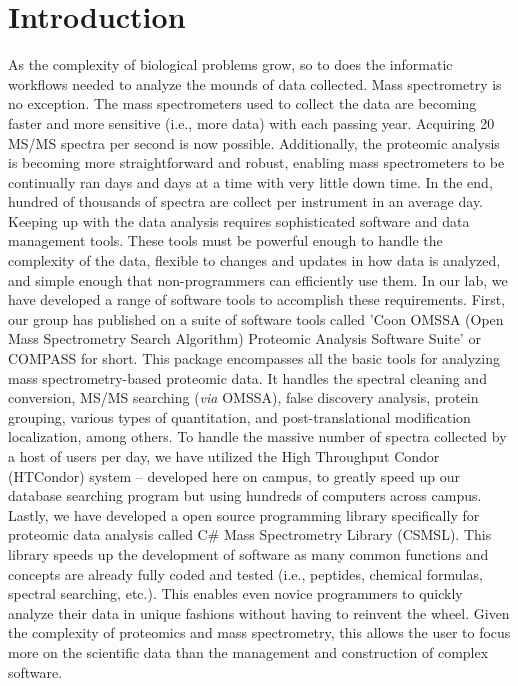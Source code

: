 \section{Introduction}
As the complexity of biological problems grow, so to does the informatic workflows needed to analyze the mounds of data collected. Mass spectrometry is no exception. The mass spectrometers used to collect the data are becoming faster and more sensitive (i.e., more data) with each passing year. Acquiring 20 MS/MS spectra per second is now possible. Additionally, the proteomic analysis is becoming more straightforward and robust, enabling mass spectrometers to be continually ran days and days at a time with very little down time. In the end, hundred of thousands of spectra are collect per instrument in an average day. Keeping up with the data analysis requires sophisticated software and data management tools. These tools must be powerful enough to handle the complexity of the data, flexible to changes and updates in how data is analyzed, and simple enough that non-programmers can efficiently use them. In our lab, we have developed a range of software tools to accomplish these requirements. First, our group has published on a suite of software tools called 'Coon OMSSA (Open Mass Spectrometry Search Algorithm) Proteomic Analysis Software Suite' or COMPASS for short. This package encompasses all the basic tools for analyzing mass spectrometry-based proteomic data. It handles the spectral cleaning and conversion, MS/MS searching (\emph{via} OMSSA), false discovery analysis, protein grouping, various types of quantitation, and post-translational modification localization, among others. To handle the massive number of spectra collected by a host of users per day, we have utilized the High Throughput Condor (HTCondor) system -- developed here on campus, to greatly speed up our database searching program but using hundreds of computers across campus. Lastly, we have developed a open source programming library specifically for proteomic data analysis called C\# Mass Spectrometry Library (CSMSL). This library speeds up the development of software as many common functions and concepts are already fully coded and tested (i.e., peptides, chemical formulas, spectral searching, etc.). This enables even novice programmers to quickly analyze their data in unique fashions without having to reinvent the wheel. Given the complexity of proteomics and mass spectrometry, this allows the user to focus more on the scientific data than the management and construction of complex software. 

